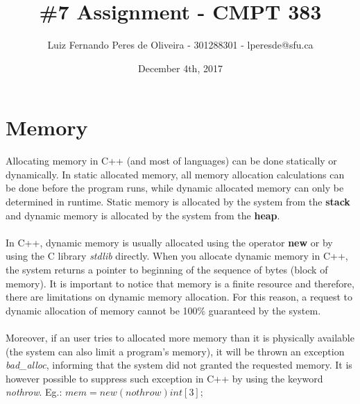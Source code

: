 \documentclass[conference]{IEEEtran}
\title{\#7 Assignment - CMPT 383}
\author{Luiz Fernando Peres de Oliveira - 301288301 - lperesde@sfu.ca}
\date{December 4th, 2017}
\begin{document}
\maketitle
\section{Memory}
Allocating memory in C++ (and most of languages) can be done statically or dynamically. In static allocated memory, all memory allocation calculations can be done before the program runs, while dynamic allocated memory can only be determined in runtime. Static memory is allocated by the system from the \textbf{stack} and dynamic memory is allocated by the system from the \textbf{heap}.
\\\\
In C++, dynamic memory is usually allocated using the operator \textbf{new} or by using the C library \textit{stdlib} directly. When you allocate dynamic memory in C++, the system returns a pointer to beginning of the sequence of bytes (block of memory). It is important to notice that memory is a finite resource and therefore, there are limitations on dynamic memory allocation. For this reason, a request to dynamic allocation of memory cannot be 100\% guaranteed by the system.
\\\\
Moreover, if an user tries to allocated more memory than it is physically available (the system can also limit a program's memory), it will be thrown an exception \textit{bad\_alloc}, informing that the system did not granted the requested memory. It is however possible to suppress such exception in C++ by using the keyword \textit{nothrow}. Eg.: $mem = new (nothrow) int [3];$
\end{document}
